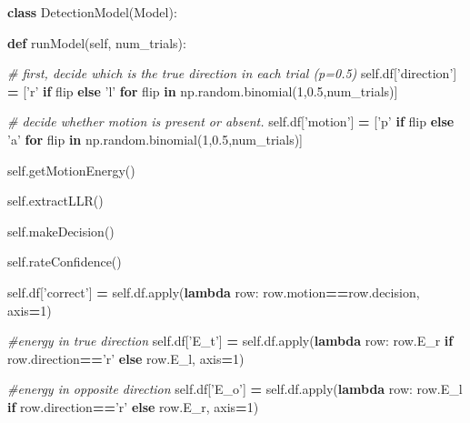 \documentclass[12pt,twoside]{reedthesis}
\newenvironment{Shaded}{\begin{snugshade}}{\end{snugshade}}
\newcommand{\BuiltInTok}[1]{#1}
\newcommand{\CommentTok}[1]{\textcolor[rgb]{0.56,0.35,0.01}{\textit{#1}}}
\newcommand{\ControlFlowTok}[1]{\textcolor[rgb]{0.13,0.29,0.53}{\textbf{#1}}}
\newcommand{\DecValTok}[1]{\textcolor[rgb]{0.00,0.00,0.81}{#1}}
\newcommand{\FloatTok}[1]{\textcolor[rgb]{0.00,0.00,0.81}{#1}}
\newcommand{\KeywordTok}[1]{\textcolor[rgb]{0.13,0.29,0.53}{\textbf{#1}}}
\newcommand{\NormalTok}[1]{#1}
\newcommand{\OperatorTok}[1]{\textcolor[rgb]{0.81,0.36,0.00}{\textbf{#1}}}
\newcommand{\StringTok}[1]{\textcolor[rgb]{0.31,0.60,0.02}{#1}}
\newcommand{\VariableTok}[1]{\textcolor[rgb]{0.00,0.00,0.00}{#1}}
\begin{document}
\begin{Shaded}
\begin{Highlighting}[]

\KeywordTok{class}\NormalTok{ DetectionModel(Model):}
    
    \KeywordTok{def}\NormalTok{ runModel(}\VariableTok{self}\NormalTok{, num_trials):}

        \CommentTok{# first, decide which is the true direction in each trial (p=0.5)}
        \VariableTok{self}\NormalTok{.df[}\StringTok{'direction'}\NormalTok{] }\OperatorTok{=}\NormalTok{ [}\StringTok{'r'} \ControlFlowTok{if}\NormalTok{ flip }\ControlFlowTok{else} \StringTok{'l'} \ControlFlowTok{for}\NormalTok{ flip }\KeywordTok{in}\NormalTok{ np.random.binomial(}\DecValTok{1}\NormalTok{,}\FloatTok{0.5}\NormalTok{,num_trials)] }
        
        \CommentTok{# decide whether motion is present or absent.}
        \VariableTok{self}\NormalTok{.df[}\StringTok{'motion'}\NormalTok{] }\OperatorTok{=}\NormalTok{ [}\StringTok{'p'} \ControlFlowTok{if}\NormalTok{ flip }\ControlFlowTok{else} \StringTok{'a'} \ControlFlowTok{for}\NormalTok{ flip }\KeywordTok{in}\NormalTok{ np.random.binomial(}\DecValTok{1}\NormalTok{,}\FloatTok{0.5}\NormalTok{,num_trials)] }
        
        \VariableTok{self}\NormalTok{.getMotionEnergy()}
        
        \VariableTok{self}\NormalTok{.extractLLR()}

        \VariableTok{self}\NormalTok{.makeDecision()}

        \VariableTok{self}\NormalTok{.rateConfidence()}
        
        \VariableTok{self}\NormalTok{.df[}\StringTok{'correct'}\NormalTok{] }\OperatorTok{=} \VariableTok{self}\NormalTok{.df.}\BuiltInTok{apply}\NormalTok{(}\KeywordTok{lambda}\NormalTok{ row: row.motion}\OperatorTok{==}\NormalTok{row.decision, axis}\OperatorTok{=}\DecValTok{1}\NormalTok{)}
        
         \CommentTok{#energy in true direction}
        \VariableTok{self}\NormalTok{.df[}\StringTok{'E_t'}\NormalTok{] }\OperatorTok{=} \VariableTok{self}\NormalTok{.df.}\BuiltInTok{apply}\NormalTok{(}\KeywordTok{lambda}\NormalTok{ row: row.E_r }\ControlFlowTok{if}\NormalTok{ row.direction}\OperatorTok{==}\StringTok{'r'} \ControlFlowTok{else}\NormalTok{ row.E_l, axis}\OperatorTok{=}\DecValTok{1}\NormalTok{)}
        
        \CommentTok{#energy in opposite direction}
        \VariableTok{self}\NormalTok{.df[}\StringTok{'E_o'}\NormalTok{] }\OperatorTok{=} \VariableTok{self}\NormalTok{.df.}\BuiltInTok{apply}\NormalTok{(}\KeywordTok{lambda}\NormalTok{ row: row.E_l }\ControlFlowTok{if}\NormalTok{ row.direction}\OperatorTok{==}\StringTok{'r'} \ControlFlowTok{else}\NormalTok{ row.E_r, axis}\OperatorTok{=}\DecValTok{1}\NormalTok{)}
        

\end{Highlighting}
\end{Shaded}
\end{document}
